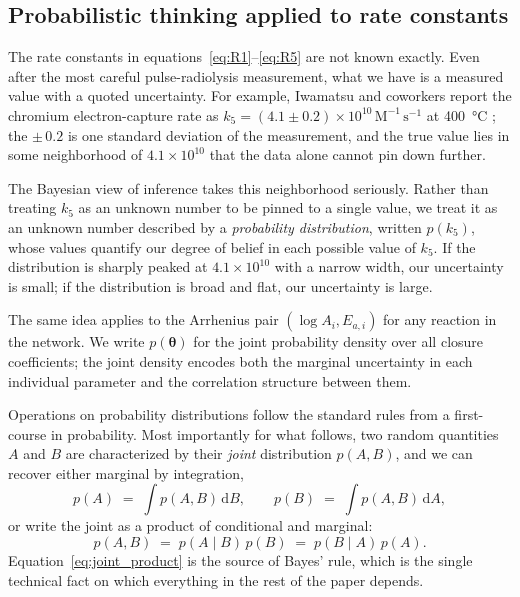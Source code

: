 \documentclass[12pt]{article}
\theoremstyle{plain}
\theoremstyle{definition}
\theoremstyle{remark}
\renewcommand{\d}{\mathrm{d}}
\begin{document}
\subsection{Probabilistic thinking applied to rate constants}\label{sec:bg:prob}

The rate constants in equations~\eqref{eq:R1}--\eqref{eq:R5} are not known
exactly.  Even after the most careful pulse-radiolysis measurement, what we
have is a measured value with a quoted uncertainty.  For example, Iwamatsu and
coworkers report the chromium electron-capture rate as
$k_5 = (4.1\pm 0.2)\times 10^{10}\,\mathrm{M}^{-1}\,\mathrm{s}^{-1}$ at
\SI{400}{\celsius} \citep{Iwamatsu2026}; the $\pm\,0.2$ is one standard
deviation of the measurement, and the true value lies in some neighborhood of
$4.1\times 10^{10}$ that the data alone cannot pin down further.

The Bayesian view of inference takes this neighborhood seriously.  Rather than
treating $k_5$ as an unknown number to be pinned to a single value, we treat
it as an unknown number described by a \emph{probability distribution}, written
$p(k_5)$, whose values quantify our degree of belief in each possible value of
$k_5$.  If the distribution is sharply peaked at $4.1\times 10^{10}$ with a
narrow width, our uncertainty is small; if the distribution is broad and flat,
our uncertainty is large.

The same idea applies to the Arrhenius pair $(\log A_i, E_{a,i})$ for any
reaction in the network.  We write $p(\boldsymbol{\theta})$ for the joint
probability density over all closure coefficients; the joint density encodes
both the marginal uncertainty in each individual parameter and the correlation
structure between them.

Operations on probability distributions follow the standard rules from a
first-course in probability.  Most importantly for what follows, two random
quantities $A$ and $B$ are characterized by their \emph{joint} distribution
$p(A,B)$, and we can recover either marginal by integration,
%
\begin{equation}
  p(A) \;=\; \int p(A,B)\,\d B,
  \qquad
  p(B) \;=\; \int p(A,B)\,\d A,
\end{equation}
%
or write the joint as a product of conditional and marginal:
%
\begin{equation}
  p(A,B) \;=\; p(A\mid B)\,p(B) \;=\; p(B\mid A)\,p(A).
  \label{eq:joint_product}
\end{equation}
%
Equation~\eqref{eq:joint_product} is the source of Bayes' rule, which is the
single technical fact on which everything in the rest of the paper depends.
\end{document}
